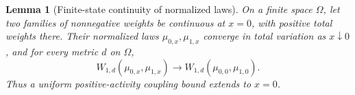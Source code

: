 \documentclass[11pt,reqno]{article}
\theoremstyle{plain}
\newtheorem{lemma}[lemma]{Lemma}
\theoremstyle{definition}
\theoremstyle{remark}
\newcommand{\Wd}{W_{1,d}}                        %
\begin{document}
\begin{lemma}[Finite-state continuity of normalized laws]
\label{lem:finite-endpoint-closure}
On a finite space \(\Omega\), let two families of nonnegative weights be
continuous at \(x=0\), with positive total weights there.  Their normalized
laws \(\mu_{0,x},\mu_{1,x}\) converge in total variation as
\(x\downarrow0\), and for every metric \(d\) on \(\Omega\),
\[
  \Wd(\mu_{0,x},\mu_{1,x})\longrightarrow
  \Wd(\mu_{0,0},\mu_{1,0}).
\]
Thus a uniform positive-activity coupling bound extends to \(x=0\).
\end{lemma}











\end{document}
